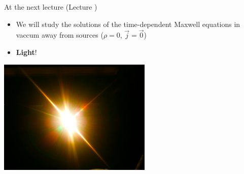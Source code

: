 \begin{frame}{At the next lecture (Lecture \nextlecture)}

\begin{itemize}
  \item We will study the solutions of the time-dependent Maxwell equations in vaccum
            away from sources ($\rho = 0$, $\vec{j} = \vec{0}$)
  \vspace{0.3cm}
  \item {\bf Light}!
\end{itemize}

\vspace{0.3cm}

\begin{center}
   \includegraphics[width=0.55\textwidth]{./images/photos/beam_of_light.jpg}\\
\end{center}

\end{frame}

%
%



